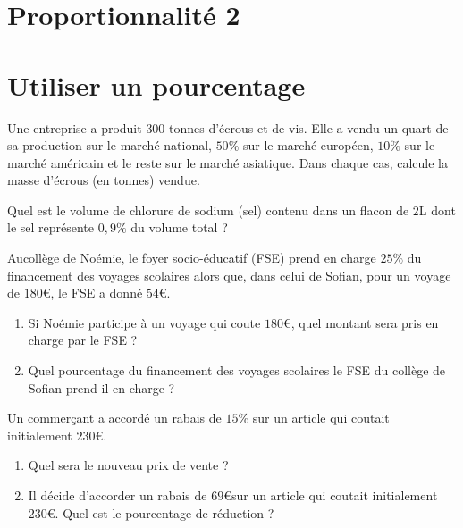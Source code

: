 \documentclass[a4paper,10pt]{report}
\begin{document}
\pagestyle{empty}
\newpage
\section*{Proportionnalité 2}

\section*{Utiliser un pourcentage}

\begin{ex}
Une entreprise a produit $300$ tonnes d'écrous et de vis. Elle a vendu un quart de sa production sur le marché national, $50\%$ sur le marché européen, $10\%$ sur le marché américain et le reste sur le marché asiatique. Dans chaque cas, calcule la masse d'écrous (en tonnes) vendue.
\end{ex}

\begin{ex}
Quel est le volume de chlorure de sodium (sel) contenu dans un flacon de $2$L dont le sel représente $0,9\%$ du volume total ?
\end{ex}

\begin{ex}
Aucollège de Noémie, le foyer socio-éducatif (FSE) prend en charge $25\%$ du financement des voyages scolaires alors que, dans celui de Sofian, pour un voyage de $180$\euro , le FSE a donné $54$\euro .

\begin{enumerate}[font=\color{exer1}]
\item Si Noémie participe à un voyage qui coute $180$\euro , quel montant sera pris en charge par le FSE ?
\item Quel pourcentage du financement des voyages scolaires le FSE du collège de Sofian prend-il en charge ?
\end{enumerate}
\end{ex}

\begin{ex}
Un commerçant a accordé un rabais de $15\%$ sur un article qui coutait initialement $230$\euro .
\begin{enumerate}[font=\color{exer1}]
\item Quel sera le nouveau prix de vente ?
\item Il décide d'accorder un rabais de $69$\euro sur un article qui coutait initialement $230$\euro . Quel est le pourcentage de réduction ? 
\end{enumerate}
\end{ex}
\end{document}
